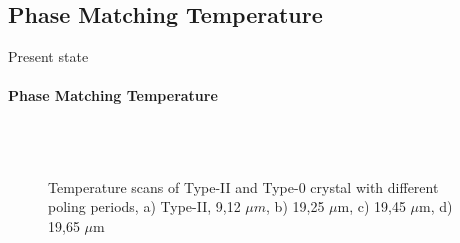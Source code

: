\documentclass[serif,8pt]{beamer}
\begin{document}
\subsection{Phase Matching Temperature}
\begin{frame}{Present state}
	\framesubtitle{Phase Matching Temperature}

	\begin{figure}[!ht]
	  \centering
	  \caption{Temperature scans of Type-II and Type-0 crystal with different poling periods, a) Type-II, 9,12 $\mu m$, 
	  b) 19,25 $\mu$m, c) 19,45 $\mu$m, d) 19,65 $\mu$m}
	  \quad
	  \\
	  \quad
	  \\
	  \label{fig:gratings}
	\end{figure}
\end{frame}
\end{document}
